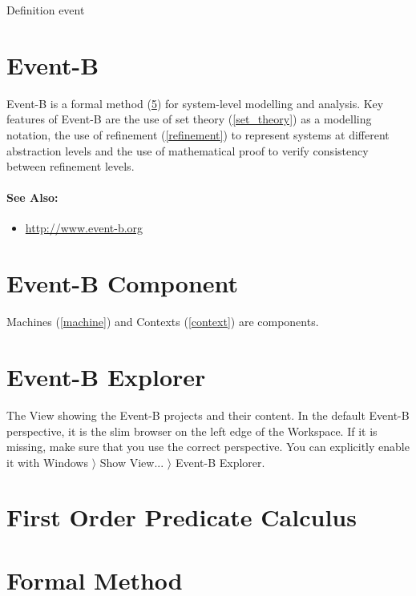 Definition event

\section{Event-B}
\label{eventb}

Event-B is a formal method (\ref{formal_method}) for system-level modelling and analysis. Key features of Event-B are the use of set theory (\ref{set_theory}) as a modelling notation, the use of refinement (\ref{refinement}) to represent systems at different abstraction levels and the use of mathematical proof to verify consistency between refinement levels.

\paragraph{See Also:}
\begin{itemize}
\item \url{http://www.event-b.org}
\end{itemize}

\section{Event-B Component}
\label{eventb_component}

Machines (\ref{machine}) and Contexts (\ref{context}) are components.

\section{Event-B Explorer}
\label{eventb_explorer}

The View showing the Event-B projects and their content.  In the default Event-B perspective, it is the slim browser on the left edge of the Workspace.  If it is missing, make sure that you use the correct perspective.  You can explicitly enable it with \textsf{Windows $\rangle$ Show View... $\rangle$ Event-B Explorer}.

\section{First Order Predicate Calculus}
\label{first_order_predicate_calculus}


\section{Formal Method}
\label{formal_method}

